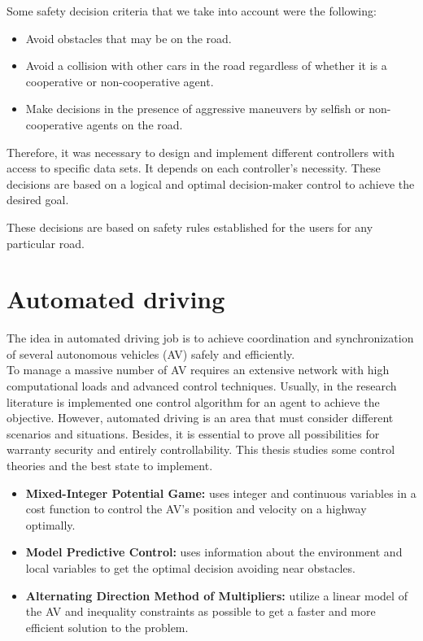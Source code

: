 Some safety decision criteria that we take into account were the following:
\begin{itemize}
\item Avoid obstacles that may be on the road.
\item Avoid a collision with other cars in the road regardless of whether it is a cooperative or non-cooperative agent.
\item Make decisions in the presence of aggressive maneuvers by selfish or non-cooperative agents on the road.

\end{itemize}


Therefore, it was necessary to design and implement different controllers with access to specific data sets. It depends on each controller's necessity. These decisions are based on a logical and optimal decision-maker control to achieve the desired goal.

 These decisions are based on safety rules established for the users for any particular road.


\section{Automated driving}
The idea in automated driving job is to achieve coordination and synchronization of several autonomous vehicles (AV) safely and efficiently.\\

To manage a massive number of  AV requires an extensive network with high computational loads and advanced control techniques. Usually, in the research literature is implemented one control algorithm for an agent to achieve the objective. However, automated driving is an area that must consider different scenarios and situations. Besides, it is essential to prove all possibilities for warranty security and entirely controllability. This thesis studies some control theories and the best state to implement.

\begin{itemize}
    \item  \textbf{Mixed-Integer Potential Game:} uses integer and continuous variables in a cost function to control the AV's position and velocity on a highway optimally.
    \item  \textbf{Model Predictive Control:} uses information about the environment and local variables to get the optimal decision avoiding near obstacles.
    \item  \textbf{Alternating Direction Method of Multipliers:} utilize a linear model of the AV and inequality constraints as possible to get a faster and more efficient solution to the problem. 
\end{itemize}

